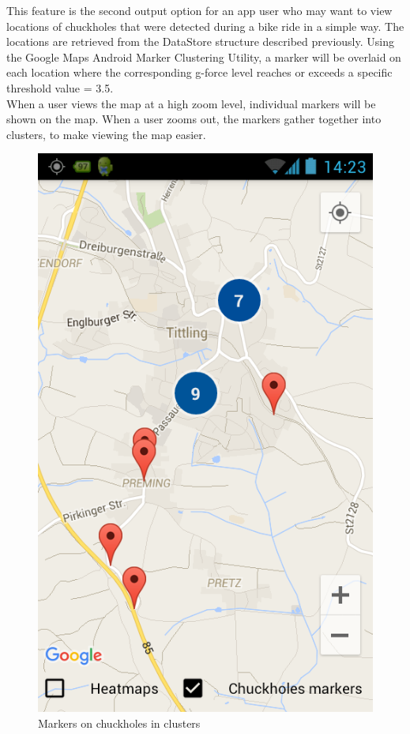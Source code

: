 \documentclass[10pt,a4paper]{article} %
\begin{document}
    This feature is the second output option for an app user who may want to view locations of chuckholes that were detected during a bike ride in a simple way. The locations are retrieved from the DataStore structure described previously. Using the Google Maps Android Marker Clustering Utility, a marker will be overlaid on each location where the corresponding g-force level reaches or exceeds a specific threshold value = 3.5. \\
    When a user views the map at a high zoom level, individual markers will be shown on the map. When a user zooms out, the markers gather together into clusters, to make viewing the map easier.
    
    \begin{figure}[H]
    \centering
	
	   
       \includegraphics[scale=0.31]{pic3}
    \caption{Markers on chuckholes in clusters}
		  \label{fig:markers_overlay}
       
        \end{figure}
    
\end{document}
